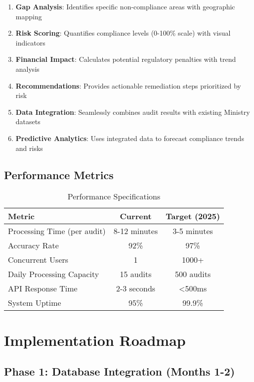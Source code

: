 \documentclass[11pt,a4paper]{article}
\begin{document}
\begin{enumerate}
    \item \textbf{Gap Analysis}: Identifies specific non-compliance areas with geographic mapping
    \item \textbf{Risk Scoring}: Quantifies compliance levels (0-100\% scale) with visual indicators
    \item \textbf{Financial Impact}: Calculates potential regulatory penalties with trend analysis
    \item \textbf{Recommendations}: Provides actionable remediation steps prioritized by risk
    \item \textbf{Data Integration}: Seamlessly combines audit results with existing Ministry datasets
    \item \textbf{Predictive Analytics}: Uses integrated data to forecast compliance trends and risks
\end{enumerate}

\subsection{Performance Metrics}

\begin{table}[H]
\centering
\begin{tabular}{lcc}
\toprule
\textbf{Metric} & \textbf{Current} & \textbf{Target (2025)} \\
\midrule
Processing Time (per audit) & 8-12 minutes & 3-5 minutes \\
Accuracy Rate & 92\% & 97\% \\
Concurrent Users & 1 & 1000+ \\
Daily Processing Capacity & 15 audits & 500 audits \\
API Response Time & 2-3 seconds & <500ms \\
System Uptime & 95\% & 99.9\% \\
\bottomrule
\end{tabular}
\caption{Performance Specifications}
\end{table}

\section{Implementation Roadmap}

\subsection{Phase 1: Database Integration (Months 1-2)}
\end{document}
